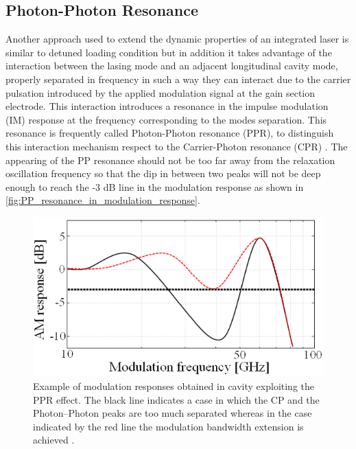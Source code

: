 \subsection{Photon-Photon Resonance}\label{subsec:pp_resonance}
Another approach used to extend the dynamic properties of an integrated laser is similar to detuned loading condition but in addition it takes advantage of the interaction between the lasing mode and an adjacent longitudinal cavity mode, properly separated in frequency in such a way they can interact due to the carrier pulsation introduced by the applied modulation signal at the gain section electrode. This interaction introduces a resonance in the impulse modulation (IM) response at the frequency corresponding to the modes separation. This resonance is frequently called Photon-Photon resonance (PPR), to distinguish this interaction mechanism respect to the Carrier-Photon resonance (CPR) \cite{montrosset2014laser}. The appearing of the PP resonance should not be too far away from the relaxation oscillation frequency so that the dip in between two peaks will not be deep enough to reach the -3 dB line in the modulation response as shown in \autoref{fig:PP_resonance_in_modulation_response}.
\begin{figure}[ht]
    \centering
    \includegraphics[width=.7\linewidth]{figures/PP_resonance_in_modulation_response.png}
    \caption{Example of modulation responses obtained in cavity exploiting the PPR effect. The black line indicates a case in which the CP and the Photon–Photon peaks are too much separated whereas in the case indicated by the red line the modulation bandwidth extension is achieved \cite{montrosset2014laser}.}
    \label{fig:PP_resonance_in_modulation_response}
\end{figure}

